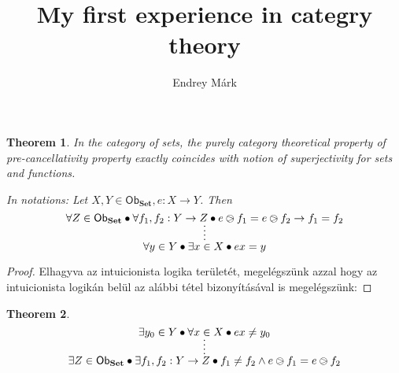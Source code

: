 \documentclass{article}
\title{My first experience in categry theory}
\author{Endrey Márk}
\newcommand{\obSet}{\ob_{\setCat}}
\newcommand{\ob}{\mathsf{Ob}}
\newcommand{\setCat}{\mathbf{Set}}
\newtheorem{thm}{Theorem}
\begin{document}
	\maketitle
	\begin{comment}
		\[
			\infer[(\lor E)_{a,b}]{C}{
				A\lor B&
				\infer*C{
					\infer[a]A{}
				}&
				\infer*C{
					\infer[b]B{}
				}
			}
		\]
	\end{comment}
	\begin{thm}
		In the category of sets, the purely category theoretical property of \emph{pre-cancellativity} property exactly coincides with notion of superjectivity for sets and functions.

		In notations: Let $X, Y \in \obSet, e: X \to Y$. Then
		\[
			\infer*{
				\forall y \in Y \bullet \exists x \in X \bullet ex = y
			}
			{
				\forall Z \in \obSet \bullet \forall f_1, f_2: Y \to Z \bullet e\ogreaterthan f_1 = e\ogreaterthan f_2 \to f_1 = f_2
			}
		\]
	\end{thm}
	\begin{proof}
		Elhagyva az intuicionista logika területét, megelégszünk azzal hogy az intuicionista logikán belül az alábbi tétel bizonyításával is megelégszünk:
	\end{proof}
	\begin{thm}
		\[
			\infer*{
				\exists Z \in \obSet \bullet \exists f_1, f_2: Y \to Z \bullet f_1 \neq f_2 \land e\ogreaterthan f_1 = e\ogreaterthan f_2
			}
			{
				\exists y_0 \in Y \bullet \forall x \in X \bullet ex \neq y_0
			}
		\]
	\end{thm}
\end{document}
